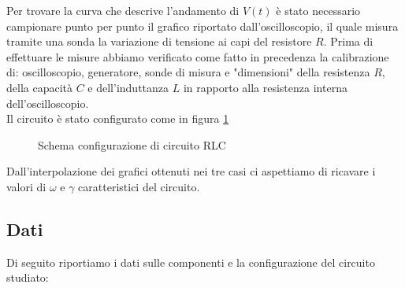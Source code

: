 \documentclass[letterpaper,12pt]{article}
\begin{document}
Per trovare la curva che descrive l'andamento di $V(t)$ è stato necessario campionare punto per punto il grafico riportato dall'oscilloscopio, il quale misura tramite una sonda la variazione di tensione ai capi del resistore $R$. Prima di effettuare le misure abbiamo verificato come fatto in precedenza la calibrazione di: oscilloscopio, generatore, sonde di misura e "dimensioni" della resistenza $R$, della capacità $C$ e dell'induttanza $L$ in rapporto alla resistenza interna dell'oscilloscopio.\\
Il circuito è stato configurato come in figura \ref{fig:config_circuito_RLC}\\

\begin{figure}[h!]
    \centering
    \caption{Schema configurazione di circuito RLC}
    \label{fig:config_circuito_RLC}
\end{figure}

Dall'interpolazione dei grafici ottenuti nei tre casi ci aspettiamo di ricavare i valori di $\omega$ e $\gamma$ caratteristici del circuito.
\newpage

\subsection{Dati} %
Di seguito riportiamo i dati sulle componenti e la configurazione del circuito studiato:
\end{document}
